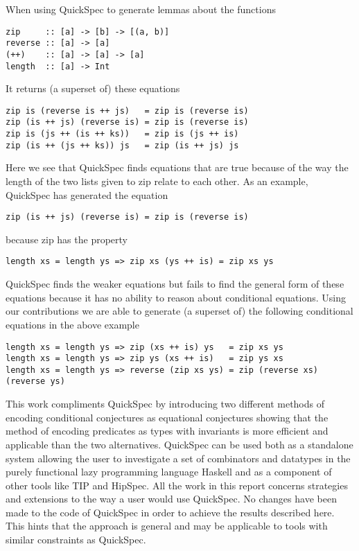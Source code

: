 When using QuickSpec to generate lemmas about the functions
\begin{verbatim}
zip     :: [a] -> [b] -> [(a, b)]
reverse :: [a] -> [a]
(++)    :: [a] -> [a] -> [a]
length  :: [a] -> Int
\end{verbatim}
It returns (a superset of) these equations
\begin{verbatim}
zip is (reverse is ++ js)   = zip is (reverse is)
zip (is ++ js) (reverse is) = zip is (reverse is)
zip is (js ++ (is ++ ks))   = zip is (js ++ is)
zip (is ++ (js ++ ks)) js   = zip (is ++ js) js
\end{verbatim}
Here we see that QuickSpec finds equations that are true
because of the way the length of the two lists given to zip relate
to each other. As an example, QuickSpec has generated the equation
\begin{verbatim}zip (is ++ js) (reverse is) = zip is (reverse is)\end{verbatim}
because zip has the property \begin{verbatim}length xs = length ys => zip xs (ys ++ is) = zip xs ys\end{verbatim}
QuickSpec finds the weaker equations but fails to find the general form
of these equations because it has no ability to reason about
conditional equations.
Using our contributions we are able to generate (a superset of) the following conditional
equations in the above example
\begin{verbatim}
length xs = length ys => zip (xs ++ is) ys   = zip xs ys
length xs = length ys => zip ys (xs ++ is)   = zip ys xs
length xs = length ys => reverse (zip xs ys) = zip (reverse xs) (reverse ys)
\end{verbatim}
This work compliments QuickSpec by introducing two different methods
of encoding conditional conjectures as equational conjectures showing that
the method of encoding predicates as types with invariants is more efficient
and applicable than the two alternatives. QuickSpec can be used both as a standalone
system allowing the user to investigate a set of combinators and datatypes in the
purely functional lazy programming language Haskell and as a component of other tools %
like TIP\cite{Rosen2015} and HipSpec\cite{Claessen2013}. 
All the work in this report concerns strategies and extensions to the way a user would
use QuickSpec. No changes have been made to the code of QuickSpec in order to
achieve the results described here. This hints that the approach is general
and may be applicable to tools with similar constraints as QuickSpec.

